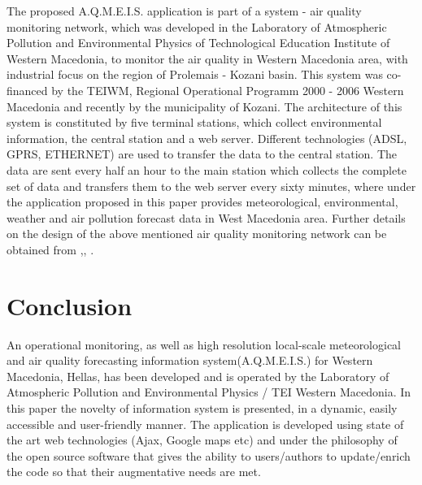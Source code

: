 \documentclass[conference]{IEEEtran}
\begin{document}
The proposed A.Q.M.E.I.S. application is part of a system - air quality monitoring network, which was developed in the Laboratory of Atmospheric Pollution and Environmental Physics of Technological Education Institute of Western Macedonia, to monitor the air  quality in Western Macedonia area, with industrial focus on the region of  Prolemais - Kozani basin. This system was co-financed by the TEIWM, Regional Operational Programm 2000 - 2006 Western Macedonia and recently by the municipality of Kozani.  The architecture of this system is constituted by five terminal stations, which collect environmental information, the central station and a web server. Different technologies (ADSL, GPRS, ETHERNET) are used to transfer the data to the central station. The  data  are sent every half an hour to  the main station which collects the complete set of data and transfers them to the web server every sixty minutes, where under the    application proposed in this paper provides meteorological, environmental, weather and air pollution forecast data in West Macedonia area. Further details on the design of the above mentioned air quality monitoring  network can be obtained from \cite {Triant2004},\cite  {TriantSkordas}, \cite {Skordas_Fragulis_Triant2011}.




 



\section{Conclusion}

 An operational monitoring, as well as high resolution local-scale meteorological and air quality forecasting information system(A.Q.M.E.I.S.) for Western Macedonia, Hellas, has been developed and is operated by the Laboratory of Atmospheric Pollution and Environmental Physics / TEI Western Macedonia. In this paper the novelty of information system  is presented, in a dynamic, easily accessible and user-friendly manner. The application is developed using state of the art web technologies (Ajax, Google maps etc) and under the philosophy of the open source software that gives the ability to users/authors to update/enrich the code so that their augmentative needs are met.
\end{document}
